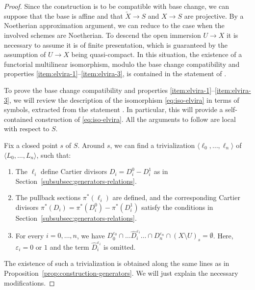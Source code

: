 \documentclass[11pt]{article}
\let\epsilon\varepsilon
\theoremstyle{plain}
\theoremstyle{definition}
\begin{document}
\begin{proof}
Since the construction is to be compatible with base change, we can suppose that the base is affine and that $\widetilde{X} \to S$ and $X\to S$ are projective. By a Noetherian approximation argument, we can reduce to the case when the involved schemes are Noetherian. To descend the open immersion $U \to X$ it is necessary to assume it is of finite presentation, which is guaranteed by the assumption of $U \to X$ being quasi-compact. In this situation, the existence of a functorial multilinear isomorphism, modulo the base change compatibility and properties \eqref{item:elvira-1}--\eqref{item:elvira-3}, is contained in the statement of \cite[Th.\,5.3.1]{Munoz}.

To prove the base change compatibility and properties \eqref{item:elvira-1}--\eqref{item:elvira-3}, we will review the description of the isomorphism \eqref{eq:iso-elvira} in terms of symbols, extracted from the statement \cite[Th.\,5.3.1]{Munoz}. In particular, this will provide a self-contained construction of \eqref{eq:iso-elvira}. All the arguments to follow are local with respect to $S$.

Fix a closed point $s$ of $S$. Around $s$, we can find a trivialization $\langle\ell_{0},\ldots,\ell_{n}\rangle$ of $\langle L_{0},\ldots, L_{n}\rangle$, such that:
\begin{enumerate}
\item[(a)] The $\ell_{i}$ define Cartier divisors $D_{i}=D_{i}^{0}-D_{i}^{1}$ as in Section~\ref{subsubsec:generators-relations}.
\item[(b)] The pullback sections $\pi^{\ast}(\ell_{i})$ are defined, and the corresponding Cartier divisors $\pi^{\ast}(D_{i})=\pi^{\ast}(D_{i}^{0})-\pi^{\ast}(D_{i}^{1})$ satisfy the conditions in Section~\ref{subsubsec:generators-relations}.
\item[(c)] For every $i=0,\ldots, n$, we have $D_{0}^{\epsilon_{0}}\cap\ldots\widehat{D}_{i}^{\epsilon_{i}}\ldots\cap D_{n}^{\epsilon_{n}}\cap (X\setminus U)_{s}=\emptyset$. Here, $\epsilon_{i}=0$ or $1$ and the term $\widehat{D}_{i}^{\epsilon_{i}}$ is omitted.
\end{enumerate}
The existence of such a trivialization is obtained along the same lines as in Proposition~\ref{prop:construction-generators}. We will just explain the necessary modifications.


\end{proof}
\end{document}
